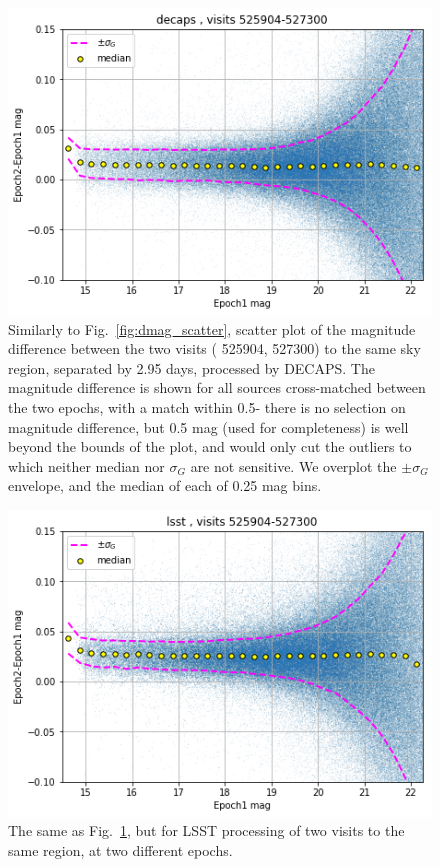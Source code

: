 \documentclass[DM,lsstdraft,toc,usenatbib]{lsstdoc}
\begin{document}
\begin{figure}
\begin{centering}
\includegraphics[width=0.7\columnwidth]{figs/18_decaps-decaps525904-527300_dmag.png}
\caption{Similarly to Fig.~\ref{fig:dmag_scatter}, scatter plot of the magnitude difference between the two  visits ( 525904, 527300) to the same sky region, separated by 2.95 days, processed by DECAPS. The magnitude difference is shown for all sources cross-matched between  the two epochs, with a match within 0.5\arcsec - there is no selection on magnitude difference, but 0.5 mag (used for completeness) is well beyond the bounds of the plot, and would only cut the outliers to which neither median nor $\sigma_{G}$ are not sensitive.  We overplot the $\pm \sigma_{G}$ envelope, and the median of each of 0.25 mag bins. }
\label{fig:decaps_decaps_dmag}
\end{centering}
\end{figure} 


\begin{figure}
\begin{centering}
\includegraphics[width=0.7\columnwidth]{figs/19_lsst-lsst525904-527300_dmag.png}
\caption{The same as Fig.~\ref{fig:decaps_decaps_dmag}, but for LSST processing of  two visits to the same region, at two different epochs. }
\label{fig:lsst_lsst_dmag}
\end{centering}
\end{figure} 
\end{document}

